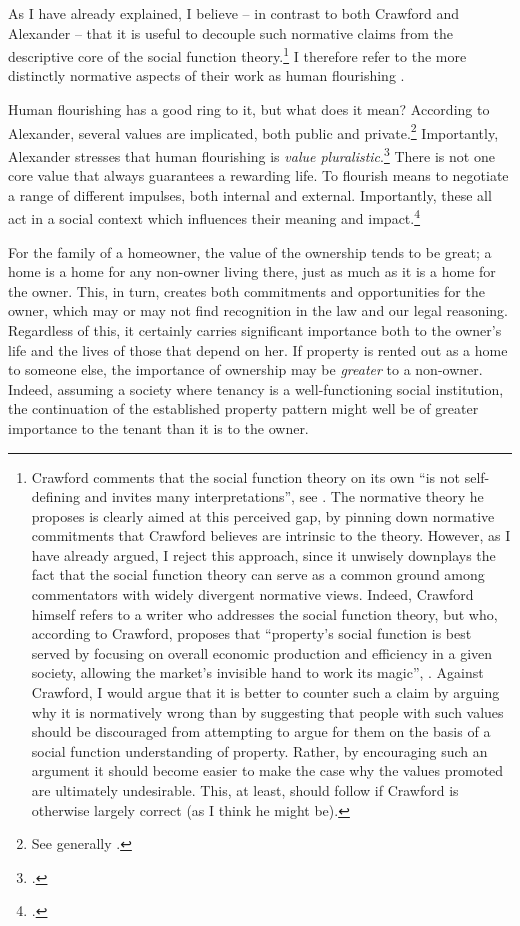 As I have already explained, I believe -- in contrast to both Crawford and Alexander -- that it is useful to decouple such normative claims from the descriptive core of the social function theory.\footnote{Crawford comments that the social function theory on its own  ``is not self-defining and invites many interpretations'', see \cite[1089]{crawford11}. The normative theory he proposes is clearly aimed at  this perceived gap, by pinning down normative commitments that Crawford believes are intrinsic to the theory. However, as I have already argued, I reject this approach, since it unwisely downplays the fact that the social function theory can serve as a common ground among commentators with widely divergent normative views. Indeed, Crawford himself refers  to a writer who addresses the social function theory, but who, according to Crawford, proposes that ``property's social function is best served by focusing on overall economic production and efficiency in a given society, allowing the market's invisible hand to work its magic'', \cite[see][1089]{crawford11}. Against Crawford, I would argue that it is better to counter such a claim by arguing why it is normatively wrong than by suggesting that people with such values should be discouraged from attempting to argue for them on the basis of a social function understanding of property. Rather, by encouraging such an argument it should become easier to make the case why the values promoted are ultimately undesirable. This, at least, should follow if Crawford is otherwise largely correct (as I think he might be).} I therefore refer to the more distinctly normative aspects of their work as human flourishing .

Human flourishing has a good ring to it, but what does it mean? According to Alexander, several values are implicated, both public and private.\footnote{See generally \cite{alexander14,alexander11}.} Importantly, Alexander stresses that human flourishing is {\it value pluralistic}.\footnote{\cite[750-751]{alexander09}.} There is not one core value that always guarantees a rewarding life. To flourish means to negotiate a range of different impulses, both internal and external. Importantly, these all act in a social context which influences their meaning and impact.\footcite[1035-1052]{alexander11}

For the family of a homeowner, the value of the ownership tends to be great; a home is a home for any non-owner living there, just as much as it is a home for the owner. This, in turn, creates both commitments and opportunities for the owner, which may or may not find recognition in the law and our legal reasoning. Regardless of this, it certainly carries significant importance both to the owner's life and the lives of those that depend on her. If property is rented out as a home to someone else, the importance of ownership may be {\it greater} to a non-owner. Indeed, assuming a society where tenancy is a well-functioning social institution, the continuation of the established property pattern might well be of greater importance to the tenant than it is to the owner.

